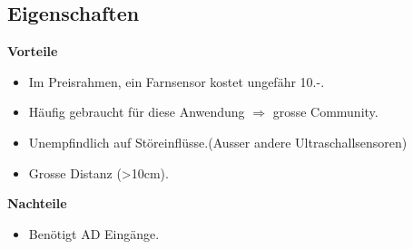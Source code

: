 \subsection{Eigenschaften}

\textbf {Vorteile}
\begin{itemize}
\item Im Preisrahmen, ein Farnsensor kostet ungefähr 10.-.
\item Häufig gebraucht für diese Anwendung $\Rightarrow$ grosse Community.
\item Unempfindlich auf Störeinflüsse.(Ausser andere Ultraschallsensoren)
\item Grosse Distanz (>10cm).\\
\end{itemize}
\textbf {Nachteile}
\begin{itemize}
\item Benötigt  AD Eingänge.
\end{itemize}